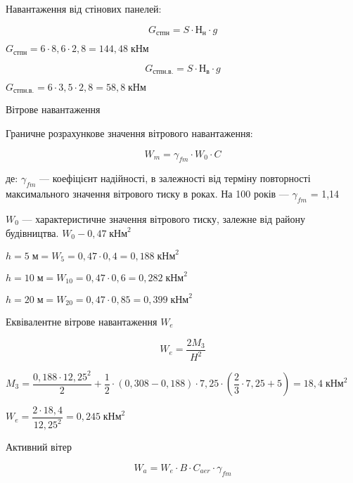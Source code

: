 \documentclass[a4paper,14pt]{article}
\begin{document}
Навантаження від стінових панелей:

\begin{equation}
    G_\textit{стпн}= S \cdot Н_\textit{н}\cdot g
\end{equation}

$G_\textit{стпн}= 6 \cdot 8,6\cdot 2,8 = 144,48\;\textit{кНм}$

\begin{equation}
    G_\textit{стпн.в.}= S \cdot Н_\textit{в}\cdot g
\end{equation}

$G_\textit{стпн.в.}= 6 \cdot 3,5\cdot 2,8= 58,8\;\textit{кНм}$

Вітрове навантаження

Граничне розрахункове значення вітрового навантаження:

\begin{equation}
    W_\textit{m}= \gamma_{fm} \cdot W_\textit{0}\cdot C
\end{equation}

де:  $\gamma_{fm}$ ---  коефіцієнт надійності, в залежності від терміну повторності максимального значення вітрового тиску в роках. На 100 років --- $\gamma_{fm}$ = 1,14

$W_\textit{0}$ --- характеристичне значення вітрового тиску, залежне від району будівництва. $W_\textit{0} - 0,47\;\textit{кНм}^2$

$h=5\;\textit{м} = W_{5}= 0,47\cdot 0,4 = 0,188\;\textit{кНм}^2$

$h=10\;\textit{м} = W_{10}= 0,47\cdot 0,6 = 0,282\;\textit{кНм}^2$

$h=20\;\textit{м} = W_{20}= 0,47\cdot 0,85 = 0,399\;\textit{кНм}^2$

Еквівалентне вітрове навантаження $W_e$

\begin{equation}
    W_\textit{e}= \dfrac{2M_3}{H^2}
\end{equation}

$M_3 = \dfrac{0,188\cdot 12,25^2}{2}+\dfrac {1}{2}\cdot (0,308-0,188)\cdot 7,25 \cdot \left(\dfrac {2}{3}\cdot 7,25 + 5\right)= 18,4\;\textit{кНм}^2$ 

$W_\textit{e}= \dfrac{2\cdot 18,4}{12,25^2}= 0,245\;\textit{кНм}^2$ 

Активний вітер 

\begin{equation}
    W_\textit{a}= W_\textit{e} \cdot B\cdot C_{aer}\cdot \gamma_{fm} 
\end{equation}
\end{document}
